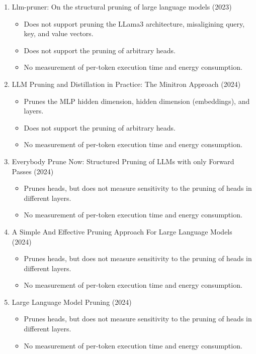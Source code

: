 \documentclass{article}
\begin{document}
    \begin{enumerate}
        \item Llm-pruner: On the structural pruning of large language models (2023)~\cite{ma2023llm}
        \begin{itemize}
            \item Does not support pruning the LLama3 architecture, misaligining query, key, and value vectors.
            \item Does not support the pruning of arbitrary heads.
            \item No measurement of per-token execution time and energy consumption.
        \end{itemize}
        \item LLM Pruning and Distillation in Practice: The Minitron Approach (2024)~\cite{sreenivas2024llm}
        \begin{itemize}
            \item Prunes the MLP hidden dimension, hidden dimension (embeddings), and layers.
            \item Does not support the pruning of arbitrary heads.
            \item No measurement of per-token execution time and energy consumption.
        \end{itemize}
        \item Everybody Prune Now: Structured Pruning of LLMs with only Forward Passes (2024)~\cite{dery2024everybodyprunenowstructured}
        \begin{itemize}
            \item Prunes heads, but does not measure sensitivity to the pruning of heads in different layers.
            \item No measurement of per-token execution time and energy consumption.
        \end{itemize}
        \item A Simple And Effective Pruning Approach For Large Language Models (2024) ~\cite{sun2024simpleeffectivepruningapproach}
        \begin{itemize}
            \item Prunes heads, but does not measure sensitivity to the pruning of heads in different layers.
            \item No measurement of per-token execution time and energy consumption.
        \end{itemize}
        \item Large Language Model Pruning (2024) ~\cite{huang2024largelanguagemodelpruning}
        \begin{itemize}
            \item Prunes heads, but does not measure sensitivity to the pruning of heads in different layers.
            \item No measurement of per-token execution time and energy consumption.
        \end{itemize}
    \end{enumerate}
\end{document}
